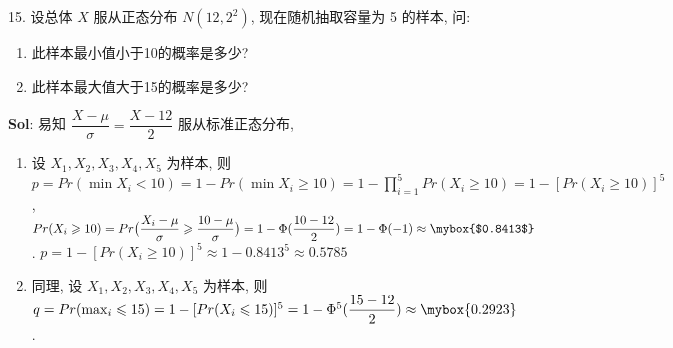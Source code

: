 \vspace{12pt}

15. 设总体 $X$ 服从正态分布 $N(12,2^2)$, 现在随机抽取容量为 5 的样本, 问:
\begin{enumerate}
    \item 此样本最小值小于10的概率是多少?
    \item 此样本最大值大于15的概率是多少?
\end{enumerate}

\textbf{Sol}: 易知 $\dfrac{X-\mu}{\sigma}=\dfrac{X-12}{2}$ 服从标准正态分布,
\begin{enumerate}
    \item 设 $X_1,X_2,X_3,X_4,X_5$ 为样本, 
    则 $p=Pr(\min X_i<10)=1-Pr(\min X_i\geqslant 10)=1-\prod_{i=1}^5Pr(X_i\geqslant10)=1-[Pr(X_i\geqslant10)]^5$,
    $Pr(X_i\geqslant10)=Pr\big(\dfrac{X_i-\mu}{\sigma}\geqslant\dfrac{10-\mu}{\sigma}\big)=1-\Phi(\dfrac{10-12}{2})=1-\Phi(-1)\approx\mybox{$0.8413$}$. 
    $p=1-[Pr(X_i\geqslant10)]^5\approx 1- 0.8413^5\approx 0.5785$
    \item 同理, 设 $X_1,X_2,X_3,X_4,X_5$ 为样本, 则
    $q=Pr(\max_i\leqslant 15)=1-[Pr(X_i\leqslant 15)]^5=1-\Phi^5(\dfrac{15-12}{2})\approx\mybox{0.2923}$.
\end{enumerate}

\vspace{12pt}
